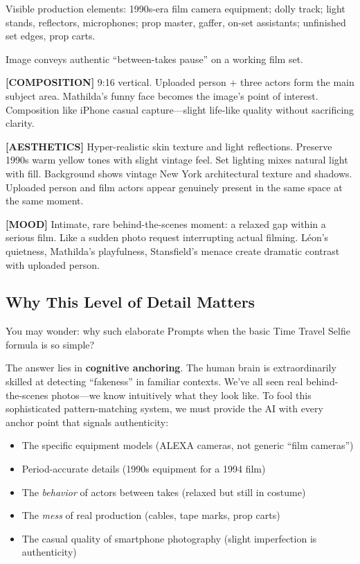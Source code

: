 \begin{Prompt}
Visible production elements: 1990s-era film camera equipment; dolly track; light stands, reflectors, microphones; prop master, gaffer, on-set assistants; unfinished set edges, prop carts.

Image conveys authentic ``between-takes pause'' on a working film set.

\textbf{[COMPOSITION]}
9:16 vertical. Uploaded person + three actors form the main subject area. Mathilda's funny face becomes the image's point of interest. Composition like iPhone casual capture—slight life-like quality without sacrificing clarity.

\textbf{[AESTHETICS]}
Hyper-realistic skin texture and light reflections. Preserve 1990s warm yellow tones with slight vintage feel. Set lighting mixes natural light with fill. Background shows vintage New York architectural texture and shadows. Uploaded person and film actors appear genuinely present in the same space at the same moment.

\textbf{[MOOD]}
Intimate, rare behind-the-scenes moment: a relaxed gap within a serious film. Like a sudden photo request interrupting actual filming. Léon's quietness, Mathilda's playfulness, Stansfield's menace create dramatic contrast with uploaded person.
\end{Prompt}

\subsection{Why This Level of Detail Matters}

You may wonder: why such elaborate Prompts when the basic Time Travel Selfie formula is so simple?

The answer lies in \textbf{cognitive anchoring}. The human brain is extraordinarily skilled at detecting ``fakeness'' in familiar contexts. We've all seen real behind-the-scenes photos—we know intuitively what they look like. To fool this sophisticated pattern-matching system, we must provide the AI with every anchor point that signals authenticity:

\begin{itemize}
\item The specific equipment models (ALEXA cameras, not generic ``film cameras'')
\item Period-accurate details (1990s equipment for a 1994 film)
\item The \textit{behavior} of actors between takes (relaxed but still in costume)
\item The \textit{mess} of real production (cables, tape marks, prop carts)
\item The casual quality of smartphone photography (slight imperfection is authenticity)
\end{itemize}

